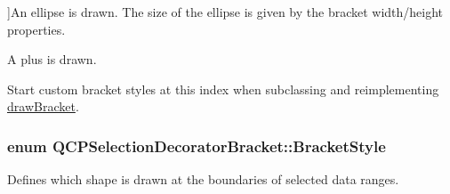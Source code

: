 \begin{Desc}
\begin{description}
{}]An ellipse is drawn. The size of the ellipse is given by the bracket width/height properties. \item[{\em 
bs\+Plus\hypertarget{class_q_c_p_selection_decorator_bracket_aa6d18517ec0553575bbef0de4252336ea1eadfcca827ad4465d8a6d50c3948b9e}{}\label{class_q_c_p_selection_decorator_bracket_aa6d18517ec0553575bbef0de4252336ea1eadfcca827ad4465d8a6d50c3948b9e}
}]A plus is drawn. \item[{\em 
bs\+User\+Style\hypertarget{class_q_c_p_selection_decorator_bracket_aa6d18517ec0553575bbef0de4252336eaacc82a3e9ed4908e11dd78678e59705e}{}\label{class_q_c_p_selection_decorator_bracket_aa6d18517ec0553575bbef0de4252336eaacc82a3e9ed4908e11dd78678e59705e}
}]Start custom bracket styles at this index when subclassing and reimplementing \hyperlink{class_q_c_p_selection_decorator_bracket_a8153966498e2a8d4c11c681e06d7d692}{draw\+Bracket}. \end{description}
\end{Desc}
\subsubsection[{\texorpdfstring{Bracket\+Style}{BracketStyle}}]{\setlength{\rightskip}{0pt plus 5cm}enum {\bf Q\+C\+P\+Selection\+Decorator\+Bracket\+::\+Bracket\+Style}}\hypertarget{class_q_c_p_selection_decorator_bracket_aa6d18517ec0553575bbef0de4252336e}{}\label{class_q_c_p_selection_decorator_bracket_aa6d18517ec0553575bbef0de4252336e}
Defines which shape is drawn at the boundaries of selected data ranges.

